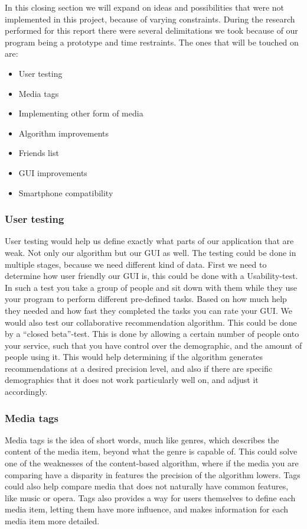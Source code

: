 In this closing section we will expand on ideas and possibilities that were not implemented in this project, because of varying constraints. During the research performed for this report there were several delimitations we took because of our program being a prototype and time restraints. The ones that will be touched on are:
\begin{itemize}
\item User testing
\item Media tags
\item Implementing other form of media
\item Algorithm improvements
\item Friends list
\item GUI improvements
\item Smartphone compatibility 
\end{itemize}

\subsubsection{User testing}
User testing would help us define exactly what parts of our application that are weak. Not only our algorithm but our GUI as well. The testing could be done in multiple stages, because we need different kind of data. First we need to determine how user friendly our GUI is, this could be done with a Usability-test. In such a test you take a group of people and sit down with them while they use your program to perform different pre-defined tasks. Based on how much help they needed and how fast they completed the tasks you can rate your GUI. We would also test our collaborative recommendation algorithm. This could be done by a “closed beta”-test. This is done by allowing a certain number of people onto your service, such that you have control over the demographic, and the amount of people using it. This would help determining if the algorithm generates recommendations at a desired precision level, and also if there are specific demographics that it does not work particularly well on, and adjust it accordingly.

\subsubsection{Media tags}\label{futureWork:Tags}
Media tags is the idea of short words, much like genres, which describes the content of the media item, beyond what the genre is capable of. This could solve one of the weaknesses of the content-based algorithm, where if the media you are comparing have a disparity in features the precision of the algorithm lowers. Tags could also help compare media that does not naturally have common features, like music or opera. Tags also provides a way for users themselves to define each media item, letting them have more influence, and makes information for each media item more detailed.

